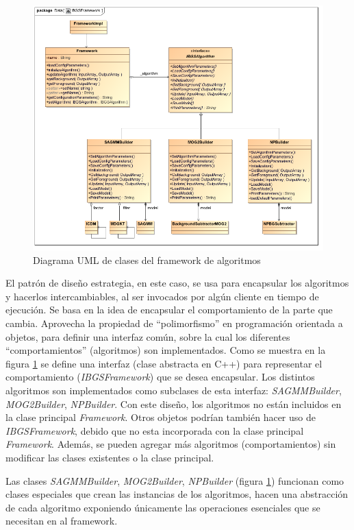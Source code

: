 \begin{figure}[h!]
\centering
\includegraphics[scale=0.5]{img/BGSFramework}
\caption[Diagrama UML de clases Framework]{Diagrama UML de clases del framework de algoritmos}
\label{fig:uml_framework}
\end{figure}

El patrón de diseño estrategia, en este caso, se usa para encapsular los algoritmos y hacerlos intercambiables, al ser invocados por algún cliente en tiempo de ejecución. Se basa en la idea de encapsular el comportamiento de la parte que cambia. Aprovecha la propiedad de ``polimorfismo'' en programación orientada a objetos, para definir una interfaz común, sobre la cual los diferentes ``comportamientos'' (algoritmos) son implementados. Como se muestra en la figura \ref{fig:uml_framework} se define una interfaz (clase abstracta en C++) para representar el comportamiento (\textit{IBGSFramework}) que se desea encapsular. Los distintos algoritmos son implementados como subclases de esta interfaz: \textit{SAGMMBuilder}, \textit{MOG2Builder}, \textit{NPBuilder}. Con este diseño, los algoritmos no están incluidos en la clase principal \textit{Framework}. Otros objetos podrían también hacer uso de \textit{IBGSFramework}, debido que no esta incorporada con la clase principal \textit{Framework}. Además, se pueden agregar más algoritmos (comportamientos) sin modificar las clases existentes o la clase principal.

Las clases \textit{SAGMMBuilder}, \textit{MOG2Builder}, \textit{NPBuilder} (figura \ref{fig:uml_framework}) funcionan como clases especiales que crean las instancias de los algoritmos, hacen una abstracción de cada algoritmo exponiendo únicamente las operaciones esenciales que se necesitan en al framework.


